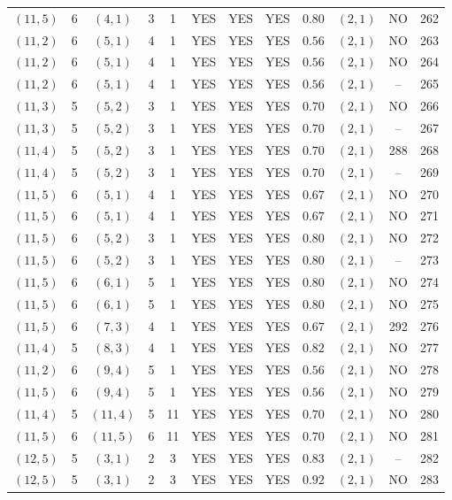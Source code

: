 \begin{longtable}{|c|c|c|c|c|c|c|c|c|c|c|c|}
$(11,5)$ & 6 & $(4,1)$ & 3 & 1 & YES & YES & YES & $0.80$ & $(2,1)$ & NO & 262\\
$(11,2)$ & 6 & $(5,1)$ & 4 & 1 & YES & YES & YES & $0.56$ & $(2,1)$ & NO & 263\\
$(11,2)$ & 6 & $(5,1)$ & 4 & 1 & YES & YES & YES & $0.56$ & $(2,1)$ & NO & 264\\
$(11,2)$ & 6 & $(5,1)$ & 4 & 1 & YES & YES & YES & $0.56$ & $(2,1)$ & -- & 265\\
$(11,3)$ & 5 & $(5,2)$ & 3 & 1 & YES & YES & YES & $0.70$ & $(2,1)$ & NO & 266\\
$(11,3)$ & 5 & $(5,2)$ & 3 & 1 & YES & YES & YES & $0.70$ & $(2,1)$ & -- & 267\\
$(11,4)$ & 5 & $(5,2)$ & 3 & 1 & YES & YES & YES & $0.70$ & $(2,1)$ & 288 & 268\\
$(11,4)$ & 5 & $(5,2)$ & 3 & 1 & YES & YES & YES & $0.70$ & $(2,1)$ & -- & 269\\
$(11,5)$ & 6 & $(5,1)$ & 4 & 1 & YES & YES & YES & $0.67$ & $(2,1)$ & NO & 270\\
$(11,5)$ & 6 & $(5,1)$ & 4 & 1 & YES & YES & YES & $0.67$ & $(2,1)$ & NO & 271\\
$(11,5)$ & 6 & $(5,2)$ & 3 & 1 & YES & YES & YES & $0.80$ & $(2,1)$ & NO & 272\\
$(11,5)$ & 6 & $(5,2)$ & 3 & 1 & YES & YES & YES & $0.80$ & $(2,1)$ & -- & 273\\
$(11,5)$ & 6 & $(6,1)$ & 5 & 1 & YES & YES & YES & $0.80$ & $(2,1)$ & NO & 274\\
$(11,5)$ & 6 & $(6,1)$ & 5 & 1 & YES & YES & YES & $0.80$ & $(2,1)$ & NO & 275\\
$(11,5)$ & 6 & $(7,3)$ & 4 & 1 & YES & YES & YES & $0.67$ & $(2,1)$ & 292 & 276\\
$(11,4)$ & 5 & $(8,3)$ & 4 & 1 & YES & YES & YES & $0.82$ & $(2,1)$ & NO & 277\\
$(11,2)$ & 6 & $(9,4)$ & 5 & 1 & YES & YES & YES & $0.56$ & $(2,1)$ & NO & 278\\
$(11,5)$ & 6 & $(9,4)$ & 5 & 1 & YES & YES & YES & $0.56$ & $(2,1)$ & NO & 279\\
$(11,4)$ & 5 & $(11,4)$ & 5 & 11 & YES & YES & YES & $0.70$ & $(2,1)$ & NO & 280\\
$(11,5)$ & 6 & $(11,5)$ & 6 & 11 & YES & YES & YES & $0.70$ & $(2,1)$ & NO & 281\\
$(12,5)$ & 5 & $(3,1)$ & 2 & 3 & YES & YES & YES & $0.83$ & $(2,1)$ & -- & 282\\
$(12,5)$ & 5 & $(3,1)$ & 2 & 3 & YES & YES & YES & $0.92$ & $(2,1)$ & NO & 283\\

\end{longtable}
